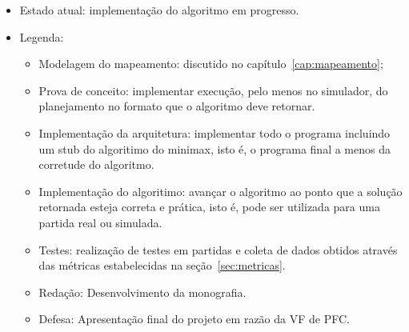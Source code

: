 \begin{itemize}
  \item Estado atual: implementação do algoritmo em progresso.
  \item Legenda:
    \begin{itemize}
      \item Modelagem do mapeamento: discutido no capítulo~\ref{cap:mapeamento};
      \item Prova de conceito: implementar execução, pelo menos no simulador, do planejamento
            no formato que o algoritmo deve retornar.
      \item Implementação da arquitetura: implementar todo o programa incluindo um stub do
            algoritimo do minimax, isto é, o programa final a menos da corretude do algoritmo.
      \item Implementação do algoritimo: avançar o algoritmo ao ponto que a solução retornada
            esteja correta e prática, isto é, pode ser utilizada para uma partida real ou
            simulada.
      \item Testes: realização de testes em partidas e coleta de dados obtidos através das
            métricas estabelecidas na seção~\ref{sec:metricas}.
      \item Redação: Desenvolvimento da monografia.
      \item Defesa: Apresentação final do projeto em razão da VF de PFC.
  \end{itemize}
\end{itemize}
